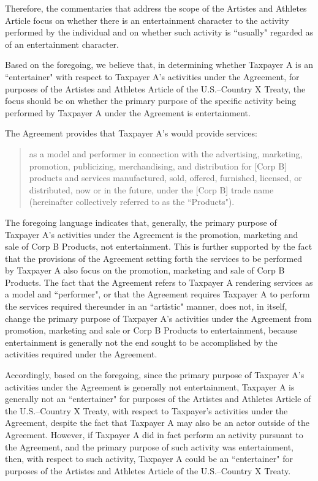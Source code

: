 \begin{select}
Therefore, the commentaries that address the scope of the Artistes and Athletes
Article focus on whether there is an entertainment character to the activity
performed by the individual and on whether such activity is ``usually" regarded as of
an entertainment character. 

Based on the foregoing, we believe that, in determining whether Taxpayer A
is an ``entertainer" with respect to Taxpayer A's activities under the Agreement, for
purposes of the Artistes and Athletes Article of the U.S.--Country X Treaty, the focus
should be on whether the primary purpose of the specific activity being performed
by Taxpayer A under the Agreement is entertainment. 

The Agreement provides that Taxpayer A's would provide services:

\begin{quotation}

as a model and performer in connection with the advertising, marketing,
promotion, publicizing, merchandising, and distribution for [Corp B] products
and services manufactured, sold, offered, furnished, licensed, or distributed,
now or in the future, under the [Corp B] trade name (hereinafter collectively
referred to as the ``Products").
\end{quotation}
The foregoing language indicates that, generally, the primary purpose of Taxpayer
A's activities under the Agreement is the promotion, marketing and sale of Corp B
Products, not entertainment. This is further supported by the fact that the
provisions of the Agreement setting forth the services to be performed by Taxpayer
A also focus on the promotion, marketing and sale of Corp B Products. The fact
that the Agreement refers to Taxpayer A rendering services as a model and
``performer", or that the Agreement requires Taxpayer A to perform the services
required thereunder in an ``artistic" manner, does not, in itself, change the primary
purpose of Taxpayer A's activities under the Agreement from promotion, marketing
and sale or Corp B Products to entertainment, because entertainment is generally
not the end sought to be accomplished by the activities required under the
Agreement.

Accordingly, based on the foregoing, since the primary purpose of Taxpayer
A's activities under the Agreement is generally not entertainment, Taxpayer A is
generally not an ``entertainer" for purposes of the Artistes and Athletes Article of the
U.S.--Country X Treaty, with respect to Taxpayer's activities under the Agreement,
despite the fact that Taxpayer A may also be an actor outside of the Agreement. 
However, if Taxpayer A did in fact perform an activity pursuant to the Agreement,
and the primary purpose of such activity was entertainment, then, with respect to
such activity, Taxpayer A could be an ``entertainer" for purposes of the Artistes and
Athletes Article of the U.S.--Country X Treaty.


\end{select}

